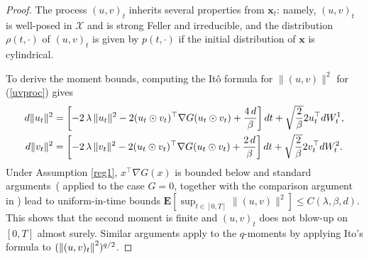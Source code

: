 \documentclass[11pt, twoside]{report}
\renewcommand{\vec}[1]{{\mathbf{#1}}}
\begin{document}
\begin{proof}
The process $(u,v)_t$ inherits several properties from $\vec x_t$:  namely, $(u,v)_t$ is well-posed in $\mathcal X$ and is strong Feller and irreducible, and the distribution $\rho(t,\cdot)$  of $(u,v)_t$ is given by $p(t,\cdot)$ if the initial distribution of $\vec x$ is cylindrical.

To derive the moment bounds, computing the It\^o formula for $\|(u,v)\|^2$ for (\ref{uvproc}) gives 
\begin{align}
d{\|u_t\|^2} 
& = \bp{-2\,\lambda\, {\|u_t\|^2} - 2{(u_t\odot v_t)^\top\nabla G(u_t \odot v_t)\strutb} + \frac{4\,d}{\beta}}\,dt+\sqrt{\frac{2}{\beta}}2u_t^\top dW_t^1, \label{Ito_norm_1_v} \\
d{\|v_t\|^2} & = \bp{-2\,\lambda\, {\|v_t\|^2} - 2{(u_t\odot v_t)^\top\nabla G(u_t \odot v_t)\strutb} + \frac{2\,d}{\beta}}\,dt+\sqrt{\frac{2}{\beta}}2v_t^\top dW_t^2.\label{Ito_norm_2_v}
\end{align}
Under Assumption \ref{reg1}, $x^\top \nabla G(x)$ is bounded below and standard arguments~(\cite[Chapter~2, Theorem~4.4]{Mao2008-ur} applied to the case $G=0$, together with the comparison argument in \cite{Ikeda1977-jj}) lead to uniform-in-time bounds $\mathbf{E}[\sup_{t \in [0,T]}\|(u,v)\|^2] \leq C(\lambda,\beta,d)$. This shows that the second moment is finite and $(u,v)_t$ does not blow-up on $[0,T]$ almost surely. Similar arguments apply to the $q$-moments by applying Ito's formula to $(\left\lVert(u,v)_t\right\rVert^2)^{q/2}$.  
\end{proof}
\end{document}
